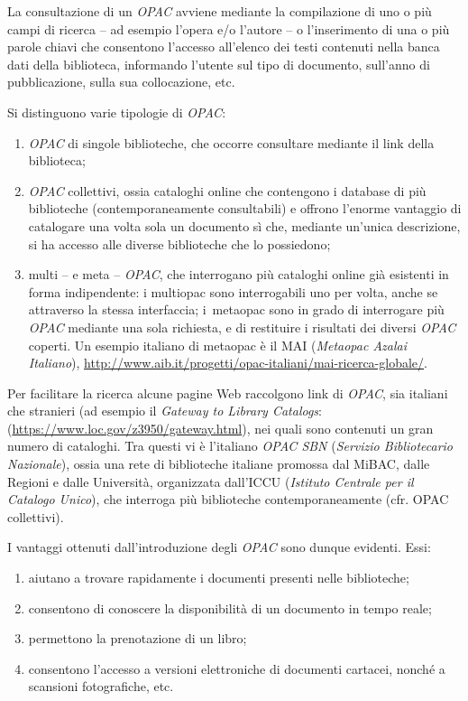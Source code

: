 \documentclass[
  b5paper,
  twoside,
  12pt,
  chapterprefix=false,
  bibliography=totocnumbered,
  parskip=false]{scrbook}
\begin{document}
La consultazione di un \emph{OPAC} avviene mediante la compilazione di uno o
più campi di ricerca -- ad esempio l'opera e/o l'autore -- o
l'inserimento di una o più parole chiavi che consentono l'accesso
all'elenco dei testi contenuti nella banca dati della biblioteca,
informando l'utente sul tipo di documento, sull'anno di pubblicazione,
sulla sua collocazione, etc.

Si distinguono varie tipologie di \emph{OPAC}:

\begin{enumerate}
\def\labelenumi{\arabic{enumi}.}
\item
  \emph{OPAC} di singole biblioteche, che occorre consultare mediante il
  link della biblioteca;
\item
  \emph{OPAC} collettivi, ossia cataloghi online che contengono i database
  di più biblioteche (contemporaneamente consultabili) e offrono
  l'enorme vantaggio di catalogare una volta sola un documento sì che,
  mediante un'unica descrizione, si ha accesso alle diverse
  biblioteche che lo possiedono;
\item
  multi -- e meta -- \emph{OPAC}, che interrogano più cataloghi online già
  esistenti in forma indipendente: i multiopac sono interrogabili uno
  per volta, anche se attraverso la stessa interfaccia; i~metaopac
  sono in grado di interrogare più \emph{OPAC} mediante una sola richiesta,
  e di restituire i risultati dei diversi \emph{OPAC} coperti. Un esempio
  italiano di metaopac è il MAI (\emph{Metaopac Azalai Italiano}),
  \href{http://www.aib.it/progetti/opac-italiani/mai-ricerca-globale/}{{http://www.aib.it/progetti/opac-italiani/mai-ricerca-globale/}}.
\end{enumerate}

Per facilitare la ricerca alcune pagine Web raccolgono link di \emph{OPAC},
sia italiani che stranieri (ad esempio il \emph{Gateway to Library Catalogs}:
(\url{https://www.loc.gov/z3950/gateway.html}),
nei quali sono contenuti un gran numero di cataloghi. Tra questi vi è
l'italiano \emph{OPAC SBN} (\emph{Servizio Bibliotecario Nazionale}), ossia una
rete di biblioteche italiane promossa dal MiBAC, dalle Regioni e dalle
Università, organizzata dall'ICCU (\emph{Istituto Centrale per il Catalogo
Unico}), che interroga più biblioteche contemporaneamente (cfr. OPAC
collettivi).

I vantaggi ottenuti dall'introduzione degli \emph{OPAC} sono dunque evidenti.
Essi:

\begin{enumerate}
\def\labelenumi{\arabic{enumi}.}
\item
  aiutano a trovare rapidamente i documenti presenti nelle
  biblioteche;
\item
  consentono di conoscere la disponibilità di un documento in tempo
  reale;
\item
  permettono la prenotazione di un libro;
\item
  consentono l'accesso a versioni elettroniche di documenti cartacei,
  nonché a scansioni fotografiche, etc.
\end{enumerate}
\end{document}
